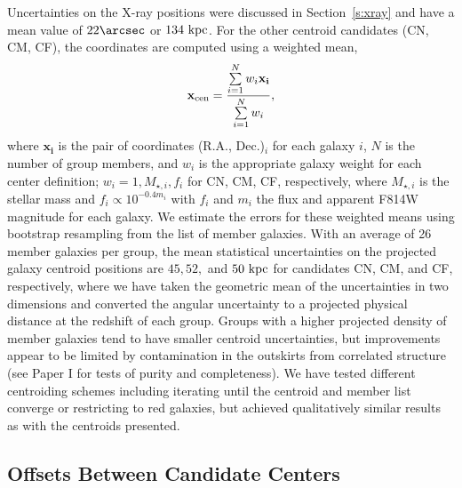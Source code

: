 \documentclass[12pt]{emulateapj}
\begin{document}
Uncertainties on the X-ray positions were discussed in Section~\ref{s:xray}
and have a mean value of $22\arcsec$ or $134~\rm{kpc}$. For the other
centroid candidates (CN, CM, CF), the coordinates are computed using a
weighted mean,
\begin{equation}
\mathbf{x_{\rm cen}} = \frac{\sum\limits_{i=1}^{N} w_i \mathbf{x_i}}{\sum\limits_{i=1}^{N} w_i},
\end{equation}
where $\mathbf{x_i}$ is the pair of coordinates (R.A., Dec.)$_i$ for
each galaxy $i$, $N$ is the number of group members, and $w_i$ is the
appropriate galaxy weight for each center definition; $w_i=1,
M_{\star,i}, f_i$ for CN, CM, CF, respectively, where $M_{\star,i}$ is
the stellar mass and $f_i\propto10^{-0.4m_i}$ with $f_i$ and $m_i$ the
flux and apparent F814W magnitude for each galaxy. We estimate the
errors for these weighted means using bootstrap resampling from the
list of member galaxies.
With an average of 26 member galaxies per group, the mean statistical
uncertainties on the projected galaxy centroid positions are $45, 52,$ and
$50~\rm{kpc}$ for candidates CN, CM, and CF, respectively, where we
have taken the geometric mean of the uncertainties in two dimensions
and converted the angular uncertainty to a projected physical distance
at the redshift of each group. Groups with a higher projected density
of member galaxies tend to have smaller centroid uncertainties, but
improvements appear to be limited by contamination in the outskirts
from correlated structure (see Paper I for tests of purity and
completeness). We have tested different centroiding schemes including
iterating until the centroid and member list converge or restricting
to red galaxies, but achieved qualitatively similar results as with
the centroids presented.

\subsection{Offsets Between Candidate Centers}
\end{document}
